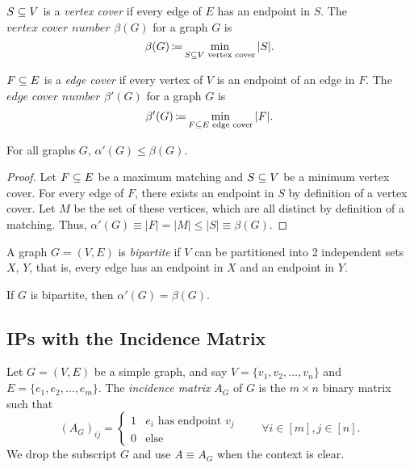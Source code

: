 \begin{defn}
    \label{def:vertex-cover}
    $S \subseteq V$ is a \textit{vertex cover} if every edge of $E$ has an endpoint in $S$. The $\textit{vertex cover number}$ $\beta(G)$ for a graph $G$ is
    \[
        \beta(G) \operatorname*{\coloneqq} \min_{S \subseteq V \text{ vertex cover}} |S|.
    \]
\end{defn}

\begin{defn}
    \label{def:edge-cover}
    $F \subseteq E$ is a \textit{edge cover} if every vertex of $V$ is an endpoint of an edge in $F$. The $\textit{edge cover number}$ $\beta'(G)$ for a graph $G$ is
    \[
        \beta'(G) \operatorname*{\coloneqq} \min_{F \subseteq E \text{ edge cover}} |F|.
    \]
\end{defn}

\begin{thm}
    \label{thm:weak-duality-matchings-vertex-covers}
    For all graphs $G$, $\alpha'(G) \le \beta(G)$.
    
    \begin{proof}
        Let $F \subseteq E$ be a maximum matching and $S \subseteq V$ be a minimum vertex cover. For every edge of $F$, there exists an endpoint in $S$ by definition of a vertex cover. Let $M$ be the set of these vertices, which are all distinct by definition of a matching. Thus, $\alpha'(G) \equiv |F| = |M| \le |S| \equiv \beta(G)$.
    \end{proof}
\end{thm}

\begin{defn}
    \label{def:bipartite-graph}
    A graph $G = (V, E)$ is \textit{bipartite} if $V$ can be partitioned into 2 independent sets $X$, $Y$, that is, every edge has an endpoint in $X$ and an endpoint in $Y$.
\end{defn}

\begin{thm}
    \label{thm:konig-egervary}
    If $G$ is bipartite, then $\alpha'(G) = \beta(G)$.
\end{thm}


\subsection{IPs with the Incidence Matrix}
\label{subsec:ips-with-incidence-matrix}

\begin{defn}
    \label{def:incidence-matrix}
    Let $G = (V,E)$ be a simple graph, and say $V = \{v_1, v_2, \dots, v_n\}$ and $E = \{e_1, e_2, \dots, e_m\}$. The \textit{incidence matrix} $A_G$ of $G$ is the $m \times n$ binary matrix such that
    \[
        (A_G)_{ij} = \begin{cases}
                        1 & e_i \text{ has endpoint } v_j \\ 
                        0 & \text{else}
                     \end{cases}
        \quad \quad
        \forall i \in [m], j \in [n].
    \]
    We drop the subscript $G$ and use $A \equiv A_G$ when the context is clear.
\end{defn}

